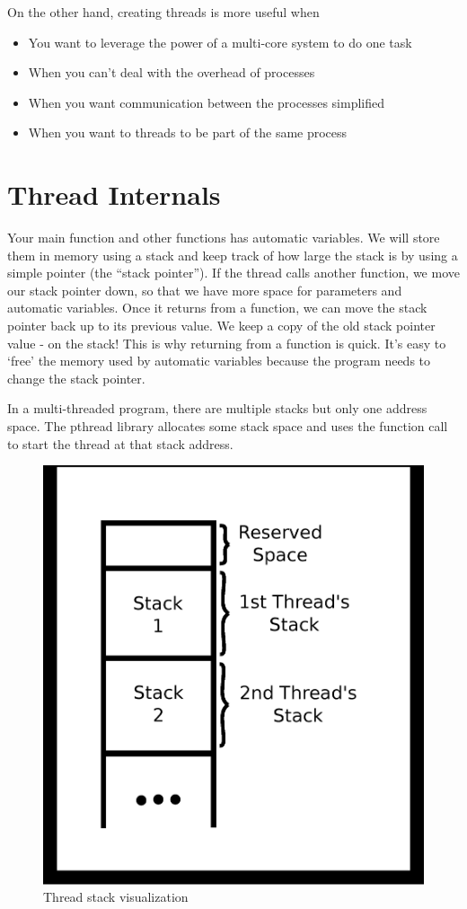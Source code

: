 On the other hand, creating threads is more useful when
\begin{itemize}
\item You want to leverage the power of a multi-core system to do one task
\item When you can't deal with the overhead of processes
\item When you want communication between the processes simplified
\item When you want to threads to be part of the same process
\end{itemize}

\section{Thread Internals}

Your main function and other functions has automatic variables.
We will store them in memory using a stack and keep track of how large the stack is by using a simple pointer (the ``stack pointer'').
If the thread calls another function, we move our stack pointer down, so that we have more space for parameters and automatic variables.
Once it returns from a function, we can move the stack pointer back up to its previous value.
We keep a copy of the old stack pointer value - on the stack!
This is why returning from a function is quick.
It's easy to `free' the memory used by automatic variables because the program needs to change the stack pointer.

In a multi-threaded program, there are multiple stacks but only one address space. The pthread library allocates some stack space and uses the  function call to start the thread at that stack address.

\begin{figure}[H]
\centering
\includegraphics[width=.5\textwidth]{threads/drawings/thread_stack.eps}
\caption{Thread stack visualization}
\end{figure}



